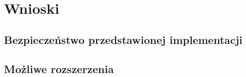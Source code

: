 \chapter{Wnioski}
\section{Bezpieczeństwo przedstawionej implementacji}
\section{Możliwe rozszerzenia}